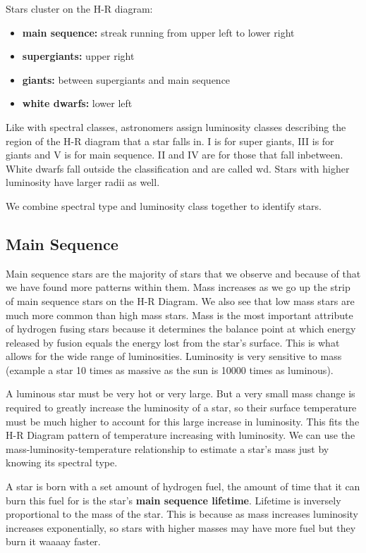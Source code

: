 \documentclass[12pt]{article}
\begin{document}
Stars cluster on the H-R diagram:
\begin{itemize}
    \item \textbf{main sequence: }streak running from upper left to lower right
    \item \textbf{supergiants: }upper right
    \item \textbf{giants: }between supergiants and main sequence
    \item \textbf{white dwarfs: }lower left
\end{itemize}

Like with spectral classes, astronomers assign luminosity classes describing the region of the H-R diagram that a star falls in. I is for super giants, III is for giants and V is for main sequence. II and IV are for those that fall inbetween. White dwarfs fall outside the classification and are called wd. Stars with higher luminosity have larger radii as well.

We combine spectral type and luminosity class together to identify stars.

\subsection{Main Sequence}
Main sequence stars are the majority of stars that we observe and because of that we have found more patterns within them. Mass increases as we go up the strip of main sequence stars on the H-R Diagram. We also see that low mass stars are much more common than high mass stars. Mass is the most important attribute of hydrogen fusing stars because it determines the balance point at which energy released by fusion equals the energy lost from the star's surface. This is what allows for the wide range of luminosities. Luminosity is very sensitive to mass (example a star 10 times as massive as the sun is 10000 times as luminous).

A luminous star must be very hot or very large. But a very small mass change is required to greatly increase the luminosity of a star, so their surface temperature must be much higher to account for this large increase in luminosity. This fits the H-R Diagram pattern of temperature increasing with luminosity. We can use the mass-luminosity-temperature relationship to estimate a star's mass just by knowing its spectral type.

A star is born with a set amount of hydrogen fuel, the amount of time that it can burn this fuel for is the star's \textbf{main sequence lifetime}. Lifetime is inversely proportional to the mass of the star. This is because as mass increases luminosity increases exponentially, so stars with higher masses may have more fuel but they burn it waaaay faster.
\end{document}
